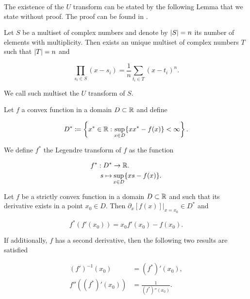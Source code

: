 The existence of the $U$ transform can be stated by the following Lemma that we state without proof. The proof can be found in \cite{anaya2016cumulantes}.

\begin{lemma}[$U$ transform]
    Let $S$ be a multiset of complex numbers and denote by $\lvert S \rvert=n$ its number of elements with multiplicity. Then exists an unique multiset of complex numbers $T$ such that $\lvert T \rvert=n$ and 

    \begin{equation*}
        \prod_{s_i \in S} (x-s_i) = \frac 1n \sum_{t_i \in T} (x-t_i)^n.
    \end{equation*}

    We call such multiset the $U$ transform of $S$.
\end{lemma}

\begin{definition}
    Let $f$ a convex function in a domain $D\subset \mathbb R$ and define

    \begin{equation} \label{eq:legendre_set}
        D^* \coloneqq \left\{ x^* \in \mathbb R \mathrel{:} \sup_{x \in D} \{xx^* - f(x)\} < \infty \right\}.
    \end{equation}

    We define $f^*$ the Legendre transform of $f$ as the function

    \begin{align*}
        f^* : D^* &\to \mathbb R.\\
        s \mapsto &\sup_{x \in D} \{ xs - f(x) \}.
    \end{align*}
\end{definition}

\begin{lemma} \label{lemma:strictly_convex}
    Let $f$ be a strictly convex function in a domain $D \subset \mathbb R$ and such that its derivative exists in a point $x_0 \in D$. Then $\left.\partial_x [f(x)]\right|_{x=x_0} \in D^*$ and 

    \begin{equation*}
        f^*(f'(x_0)) = x_0 f'(x_0) - f(x_0).
    \end{equation*}

    If additionally, $f$ has a second derivative, then the following two results are satisfied

    \begin{align*}
        (f')^{-1}(x_0) &= (f^*)'(x_0), \\
        f''((f^*)'(x_0)) &= \frac{1}{(f^*)''(x_0)}.
    \end{align*}
\end{lemma}


